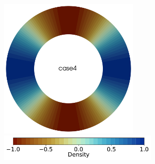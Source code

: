\documentclass[12pt]{article}
\numberwithin{equation}{subsection}
\begin{document}
\begin{figure}[!htb]
\begin{multicols}{4}
		\hspace{2.25in}
		\includegraphics[width=7cm]{./case4/rho_ana.png}
	\end{multicols}
	\vspace{-0.3in}
	\begin{multicols}{1}
		\hspace{4.0in} \includegraphics[width=8cm]{./case1/rho_ana_cbhorz.pdf}
	\end{multicols}
	
	\vspace{-0.3in}
	

\end{figure}
\end{document}
